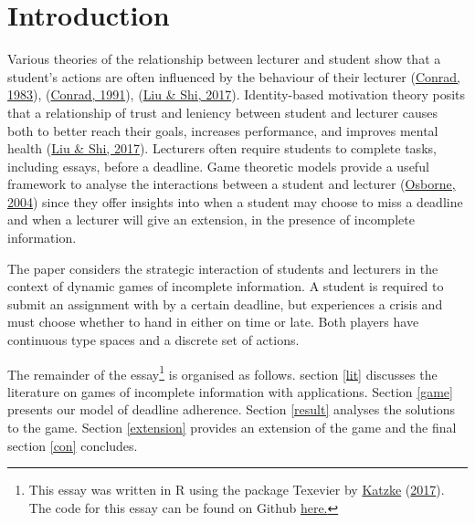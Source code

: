 \documentclass[11pt,preprint, authoryear]{elsarticle}
\numberwithin{equation}{section}
\numberwithin{figure}{section}
\numberwithin{table}{section}
\let\rmarkdownfootnote\footnote%
\def\footnote{\protect\rmarkdownfootnote}
\begin{document}
\renewcommand{\contentsname}{Table of Contents}
{\tableofcontents}

\pagestyle{fancy}
\chead{}
\rhead{}
\lfoot{}
\lhead{}
\cfoot{}


\headsep 35pt %




\newpage

\hypertarget{introduction}{%
\section{\texorpdfstring{Introduction
\label{intro}}{Introduction }}\label{introduction}}

Various theories of the relationship between lecturer and student show
that a student's actions are often influenced by the behaviour of their
lecturer (\protect\hyperlink{ref-power}{Conrad, 1983}),
(\protect\hyperlink{ref-comm}{Conrad, 1991}),
(\protect\hyperlink{ref-trust}{Liu \& Shi, 2017}). Identity-based
motivation theory posits that a relationship of trust and leniency
between student and lecturer causes both to better reach their goals,
increases performance, and improves mental health
(\protect\hyperlink{ref-trust}{Liu \& Shi, 2017}). Lecturers often
require students to complete tasks, including essays, before a deadline.
Game theoretic models provide a useful framework to analyse the
interactions between a student and lecturer
(\protect\hyperlink{ref-book}{Osborne, 2004}) since they offer insights
into when a student may choose to miss a deadline and when a lecturer
will give an extension, in the presence of incomplete information.

The paper considers the strategic interaction of students and lecturers
in the context of dynamic games of incomplete information. A student is
required to submit an assignment with by a certain deadline, but
experiences a crisis and must choose whether to hand in either on time
or late. Both players have continuous type spaces and a discrete set of
actions.

The remainder of the essay\footnote{This essay was written in R using
  the package Texevier by \protect\hyperlink{ref-Texevier}{Katzke}
  (\protect\hyperlink{ref-Texevier}{2017}). \newline The code for this
  essay can be found on Github
  \href{https://github.com/cass-code/Essay}{here.}} is organised as
follows. section \ref{lit} discusses the literature on games of
incomplete information with applications. Section \ref{game} presents
our model of deadline adherence. Section \ref{result} analyses the
solutions to the game. Section \ref{extension} provides an extension of
the game and the final section \ref{con} concludes.
\end{document}
